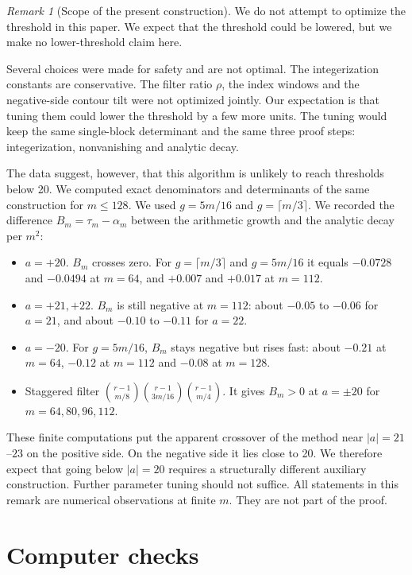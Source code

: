 \documentclass{amsart}
\theoremstyle{remark}
\newtheorem{remark}{Remark}[section]
\numberwithin{equation}{section}
\numberwithin{table}{section}
\begin{document}
\begin{remark}[Scope of the present construction]\label{rem:scope}
We do not attempt to optimize the threshold in this paper. We expect that
the threshold could be lowered, but we make no lower-threshold claim here.

Several choices were made for safety and are not optimal. The
integerization constants are conservative. The filter ratio $\rho$, the
index windows and the negative-side contour tilt were not optimized jointly.
Our expectation is that tuning them could lower the threshold by a few more
units. The tuning would keep the same single-block determinant and the same
three proof steps:
integerization, nonvanishing and analytic decay.

The data suggest, however, that this algorithm is unlikely to reach
thresholds below 20. We computed exact denominators and determinants of the
same construction for $m\le128$. We used $g=5m/16$ and $g=\lceil m/3\rceil$.
We recorded the difference
$B_m=\tau_m-\alpha_m$ between the arithmetic growth and the analytic decay
per $m^2$:
\begin{itemize}
\item $a=+20$. $B_m$ crosses zero. For $g=\lceil m/3\rceil$ and $g=5m/16$
it equals $-0.0728$ and $-0.0494$ at $m=64$, and $+0.007$ and $+0.017$ at
$m=112$.
\item $a=+21,+22$. $B_m$ is still negative at $m=112$: about $-0.05$ to
$-0.06$ for $a=21$, and about $-0.10$ to $-0.11$ for $a=22$.
\item $a=-20$. For $g=5m/16$, $B_m$ stays negative but rises fast: about
$-0.21$ at $m=64$, $-0.12$ at $m=112$ and $-0.08$ at $m=128$.
\item Staggered filter $\binom{r-1}{m/8}\binom{r-1}{3m/16}\binom{r-1}{m/4}$.
It gives $B_m>0$ at $a=\pm20$ for $m=64,80,96,112$.
\end{itemize}
These finite computations put the apparent crossover of the method near
$|a|=21$--$23$ on the positive side. On the negative side it lies close to
20. We therefore expect that going below $|a|=20$ requires a structurally
different auxiliary construction. Further parameter tuning should not
suffice. All statements in this remark are numerical observations at finite
$m$. They are not part of the proof.
\end{remark}




\section{Computer checks}\label{app:checks}
\end{document}
